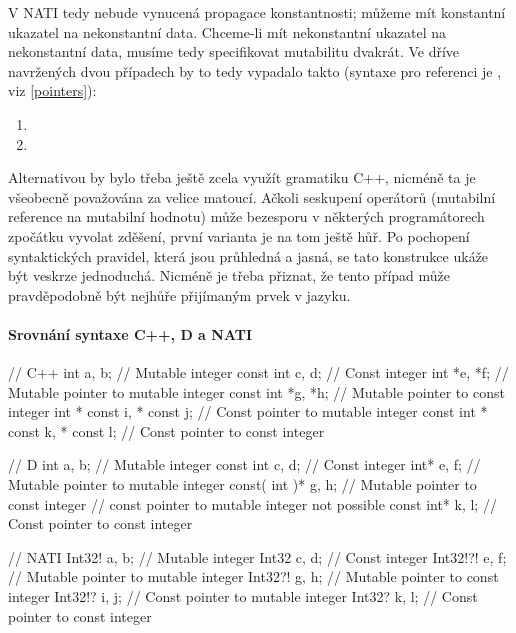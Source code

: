 V NATI tedy nebude vynucená propagace konstantnosti; můžeme mít konstantní ukazatel na nekonstantní data. Chceme-li mít nekonstantní ukazatel na nekonstantní data, musíme tedy specifikovat mutabilitu dvakrát. Ve dříve navržených dvou případech by to tedy vypadalo takto (syntaxe pro referenci je , viz \ref{pointers}):
\begin{enumerate}
	\item {}
	\item {}
\end{enumerate}

Alternativou by bylo třeba ještě zcela využít gramatiku C++, nicméně ta je všeobecně považována za velice matoucí. Ačkoli seskupení operátorů  (mutabilní reference na mutabilní hodnotu) může bezesporu v některých programátorech zpočátku vyvolat zděšení, první varianta je na tom ještě hůř. Po pochopení syntaktických pravidel, která jsou průhledná a jasná, se tato konstrukce ukáže být veskrze jednoduchá. Nicméně je třeba přiznat, že tento případ může pravděpodobně být nejhůře přijímaným prvek v jazyku.

\paragraph{Srovnání syntaxe C++, D a NATI}
\begin{cppcode}
	// C++
	int a, b; // Mutable integer
	const int c, d; // Const integer
	int *e, *f; // Mutable pointer to mutable integer
	const int *g, *h; // Mutable pointer to const integer
	int * const i, * const j; // Const pointer to mutable integer
	const int * const k, * const l; // Const pointer to const integer
\end{cppcode}
\begin{dcode}
	// D
	int a, b; // Mutable integer
	const int c, d; // Const integer
	int* e, f; // Mutable pointer to mutable integer
	const( int )* g, h; // Mutable pointer to const integer
	// const pointer to mutable integer not possible
	const int* k, l; // Const pointer to const integer
\end{dcode}
\begin{code}
	// NATI
	Int32! a, b; // Mutable integer
	Int32 c, d; // Const integer
	Int32!?! e, f; // Mutable pointer to mutable integer
	Int32?! g, h; // Mutable pointer to const integer
	Int32!? i, j; // Const pointer to mutable integer
	Int32? k, l; // Const pointer to const integer
\end{code}


